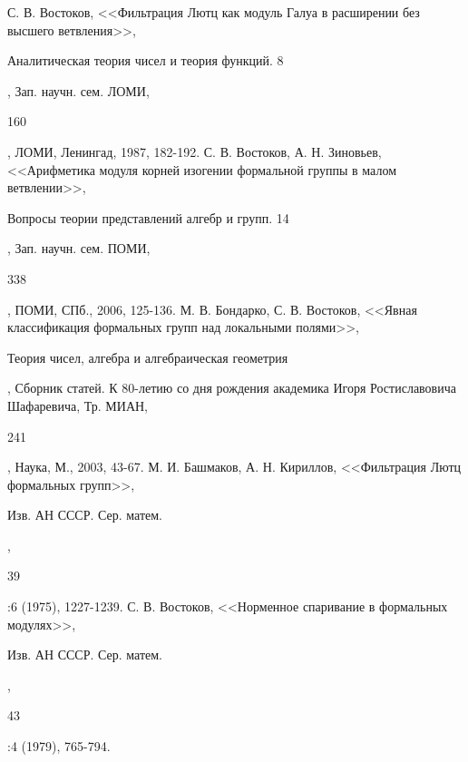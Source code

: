 \documentclass[a4paper]{article}
\begin{document}
\pagebreak 


\begin{thebibliography}{3}   
    С. В. Востоков, <<Фильтрация Лютц как модуль Галуа в расширении без высшего ветвления>>, \begin{it}Аналитическая теория чисел и теория функций. 8\end{it}, Зап. научн. сем. ЛОМИ, \begin{bf}160\end{bf}, ЛОМИ, Ленингад, 1987, 182-192.           
    С. В. Востоков, А. Н. Зиновьев, <<Арифметика модуля корней изогении формальной группы в малом ветвлении>>, \begin{it}Вопросы теории представлений алгебр и групп. 14\end{it}, Зап. научн. сем. ПОМИ, \begin{bf}338\end{bf}, ПОМИ, СПб., 2006, 125-136.           
    М. В. Бондарко, С. В. Востоков, <<Явная классификация формальных групп над локальными полями>>, \begin{it}Теория чисел, алгебра и алгебраическая геометрия\end{it}, Сборник статей. К 80-летию со дня рождения академика Игоря Ростиславовича Шафаревича, Тр. МИАН, \begin{bf}241\end{bf}, Наука, М., 2003, 43-67.
    М. И. Башмаков, А. Н. Кириллов, <<Фильтрация Лютц формальных групп>>, \begin{it}Изв. АН СССР. Сер. матем.\end{it}, \begin{bf}39\end{bf}:6 (1975), 1227-1239.
    С. В. Востоков, <<Норменное спаривание в формальных модулях>>, \begin{it}Изв. АН СССР. Сер. матем.\end{it}, \begin{bf}43\end{bf}:4 (1979), 765-794.

\end{thebibliography}  
\end{document}
